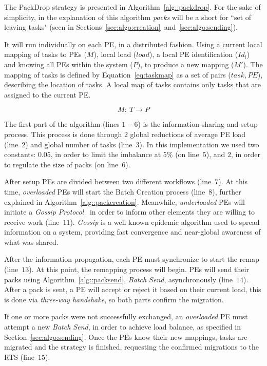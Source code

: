 The PackDrop strategy is presented in Algorithm~\ref{alg::packdrop}.
For the sake of simplicity, in the explanation of this algorithm \textit{packs} will be a short for ``set of leaving tasks" (seen in Sections~\ref{sec:algo:creation}~and~\ref{sec:algo:sending}).

It will run individually on each PE, in a distributed fashion. 
Using a current local mapping of tasks to PEs ($M$), local load ($load$), a local PE identification ($Id_l$) and knowing all PEs within the system ($P$), to produce a new mapping ($M'$).
The mapping of tasks is defined by Equation~\ref{eq:taskmap} as a set of pairs ($task, PE$), describing the location of tasks.
A local map of tasks contains only tasks that are assigned to the current PE.

\begin{equation}
	M:\ T \rightarrow P
	\label{eq:taskmap}
\end{equation}

The first part of the algorithm (lines $1-6$) is the information sharing and setup process. 
This process is done through $2$ global reductions of average PE load (line~$2$) and global number of tasks (line~$3$).
In this implementation we used two constants: $0.05$, in order to limit the imbalance at $5\%$ (on line~$5$), and $2$, in order to regulate the size of packs (on line~$6$).

After setup PEs are divided between two different workflows (line~$7$).
At this time, \textit{overloaded} PEs will start the Batch Creation process (line~$8$), further explained in Algorithm~\ref{alg::packcreation}.
Meanwhile, \textit{underloaded} PEs will initiate a \textit{Gossip Protocol}~\cite{gossip} in order to inform other elements they are willing to receive work (line~$11$).
\textit{Gossip} is a well known epidemic algorithm used to spread information on a system, providing fast convergence and near-global awareness of what was shared.

After the information propagation, each PE must synchronize to start the remap (line~$13$). 
At this point, the remapping process will begin.
PEs will send their packs using Algorithm~\ref{alg::packsend}, \textit{Batch Send}, asynchronously (line~$14$).
After a pack is sent, a PE will accept or reject it based on their current load, this is done via \textit{three-way handshake}, so both parts confirm the migration.

If one or more packs were not successfully exchanged, an \textit{overloaded} PE must attempt a new \textit{Batch Send}, in order to achieve load balance, as specified in Section~\ref{sec:algo:sending}.
Once the PEs know their new mappings, tasks are migrated and the strategy is finished, requesting the confirmed migrations to the RTS (line~$15$). 

